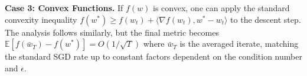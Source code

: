 \documentclass{article}
\begin{document}
\textbf{Case 3: Convex Functions.} If $f(w)$ is convex, one can apply the standard convexity inequality $f(w^*) \geq f(w_t) + \langle \nabla f(w_t), w^* - w_t \rangle$ to the descent step. The analysis follows similarly, but the final metric becomes $\mathbb{E}[f(\bar{w}_T) - f(w^*)] = O(1/\sqrt{T})$ where $\bar{w}_T$ is the averaged iterate, matching the standard SGD rate up to constant factors dependent on the condition number and $\epsilon$.
\end{document}
